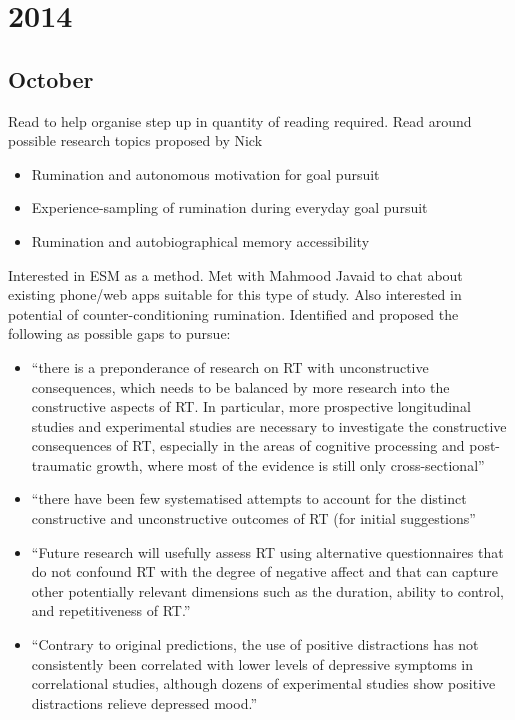 \documentclass[british]{article}
\title{}
\author{Paul Sharpe}
\date{2015-09-16}
\begin{document}
\section{2014}

\subsection{October}

Read \textcite{shon_how_2012} to help organise step up in quantity of
reading required. Read around possible research topics proposed by Nick

\begin{itemize}
  \item Rumination and autonomous motivation for goal pursuit \parencite{thomsen_people_2011,watkins_constructive_2008}
  \item Experience-sampling of rumination during everyday goal pursuit
    \parencite{moberly_negative_2010,watkins_habitgoal_2014}
  \item Rumination and autobiographical memory accessibility
    \parencite{conway_construction_2000,schoofs_selfdiscrepancy_2013,debeer_operant_2014}
\end{itemize}

Interested in ESM as a method. Met with Mahmood Javaid to chat about
existing phone/web apps suitable for this type of study. Also interested
in potential of counter-conditioning rumination. Identified and proposed
the following as possible gaps to pursue:

\begin{itemize}
  \item \enquote{there is a preponderance of research on RT with
  unconstructive consequences, which needs to be balanced by more
  research into the constructive aspects of RT. In particular,
  more prospective longitudinal studies and experimental studies
  are necessary to investigate the constructive consequences of RT,
  especially in the areas of cognitive processing and post-traumatic
  growth, where most of the evidence is still only cross-sectional}
  \parencite{watkins_constructive_2008}

  \item \enquote{there have been few systematised attempts to account for
  the distinct constructive and unconstructive outcomes of RT (for initial
  suggestions} \parencite{watkins_constructive_2008}

  \item \enquote{Future research will usefully assess RT using alternative
  questionnaires that do not confound RT with the degree of negative
  affect and that can capture other potentially relevant dimensions
  such as the duration, ability to control, and repetitiveness of RT.}
  \parencite{watkins_constructive_2008}

  \item \enquote{Contrary to original predictions, the use of positive
  distractions has not consistently been correlated with lower levels
  of depressive symptoms in correlational studies, although dozens of
  experimental studies show positive distractions relieve depressed mood.}
  \parencite{nolen-hoeksema_rethinking_2008}
\end{itemize}
\end{document}
